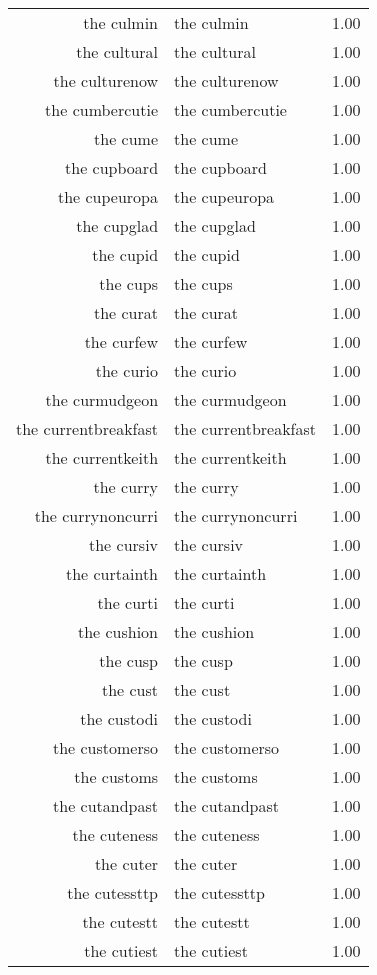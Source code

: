 \begin{table}[ht]
\begin{tabular}{rlr}
  the culmin & the culmin & 1.00 \\ 
  the cultural & the cultural & 1.00 \\ 
  the culturenow & the culturenow & 1.00 \\ 
  the cumbercutie & the cumbercutie & 1.00 \\ 
  the cume & the cume & 1.00 \\ 
  the cupboard & the cupboard & 1.00 \\ 
  the cupeuropa & the cupeuropa & 1.00 \\ 
  the cupglad & the cupglad & 1.00 \\ 
  the cupid & the cupid & 1.00 \\ 
  the cups & the cups & 1.00 \\ 
  the curat & the curat & 1.00 \\ 
  the curfew & the curfew & 1.00 \\ 
  the curio & the curio & 1.00 \\ 
  the curmudgeon & the curmudgeon & 1.00 \\ 
  the currentbreakfast & the currentbreakfast & 1.00 \\ 
  the currentkeith & the currentkeith & 1.00 \\ 
  the curry & the curry & 1.00 \\ 
  the currynoncurri & the currynoncurri & 1.00 \\ 
  the cursiv & the cursiv & 1.00 \\ 
  the curtainth & the curtainth & 1.00 \\ 
  the curti & the curti & 1.00 \\ 
  the cushion & the cushion & 1.00 \\ 
  the cusp & the cusp & 1.00 \\ 
  the cust & the cust & 1.00 \\ 
  the custodi & the custodi & 1.00 \\ 
  the customerso & the customerso & 1.00 \\ 
  the customs & the customs & 1.00 \\ 
  the cutandpast & the cutandpast & 1.00 \\ 
  the cuteness & the cuteness & 1.00 \\ 
  the cuter & the cuter & 1.00 \\ 
  the cutessttp & the cutessttp & 1.00 \\ 
  the cutestt & the cutestt & 1.00 \\ 
  the cutiest & the cutiest & 1.00 \\ 

\end{tabular}
\end{table}
